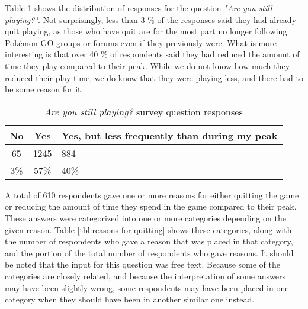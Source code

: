 
Table \ref{tbl:still-playing} shows the distribution of responses for the question \emph{"Are you still playing?"}. Not surprisingly, less than 3 \% of the responses said they had already quit playing, as those who have quit are for the most part no longer following Pokémon GO groups or forums even if they previously were. What is more interesting is that over 40 \% of respondents said they had reduced the amount of time they play compared to their peak. While we do not know how much they reduced their play time, we do know that they were playing less, and there had to be some reason for it.

\begin{table}[h]
	\centering
	\caption{\emph{Are you still playing?} survey question responses}
	\label{tbl:still-playing}
	\begin{tabular}{|c|c|l|}
		\hline
		\textbf{No} & \textbf{Yes} & \textbf{Yes, but less frequently than during my peak}\\
		\hline\hline
		65 & 1245 & 884\\
		3\% & 57\% & 40\%\\\hline
	\end{tabular}
\end{table}

A total of 610 respondents gave one or more reasons for either quitting the game or reducing the amount of time they spend in the game compared to their peak. These answers were categorized into one or more categories depending on the given reason. Table \ref{tbl:reasons-for-quitting} shows these categories, along with the number of respondents who gave a reason that was placed in that category, and the portion of the total number of respondents who gave reasons. It should be noted that the input for this question was free text. Because some of the categories are closely related, and because the interpretation of some answers may have been slightly wrong, some respondents may have been placed in one category when they should have been in another similar one instead.

